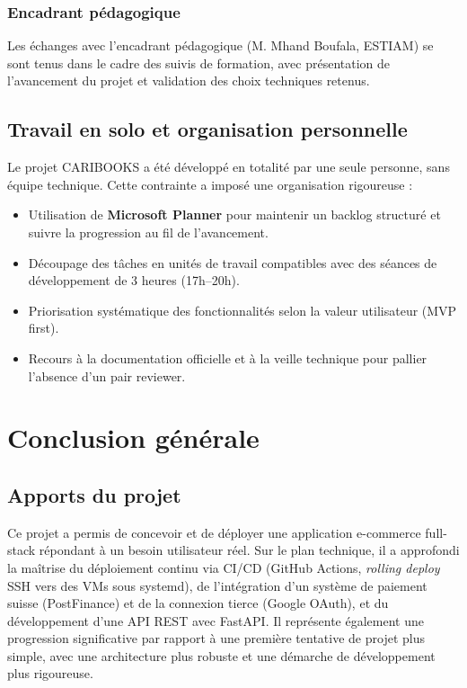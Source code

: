 \documentclass[12pt, a4paper]{report}
\renewcommand{\_}{\origunderscore\allowbreak}
\begin{document}
\subsection{Encadrant pédagogique}

Les échanges avec l'encadrant pédagogique (M. Mhand Boufala, ESTIAM) se sont tenus dans le cadre des suivis de formation, avec présentation de l'avancement du projet et validation des choix techniques retenus.

\section{Travail en solo et organisation personnelle}

Le projet CARIBOOKS a été développé en totalité par une seule personne, sans équipe technique. Cette contrainte a imposé une organisation rigoureuse :

\begin{itemize}
    \item Utilisation de \textbf{Microsoft Planner} pour maintenir un backlog structuré et suivre la progression au fil de l'avancement.
    \item Découpage des tâches en unités de travail compatibles avec des séances de développement de 3 heures (17h–20h).
    \item Priorisation systématique des fonctionnalités selon la valeur utilisateur (MVP first).
    \item Recours à la documentation officielle et à la veille technique pour pallier l'absence d'un pair reviewer.
\end{itemize}

\chapter*{Conclusion générale}

\section*{Apports du projet}

Ce projet a permis de concevoir et de déployer une application e-commerce full-stack répondant à un besoin utilisateur réel. Sur le plan technique, il a approfondi la maîtrise du déploiement continu via CI/CD (GitHub Actions, \textit{rolling deploy} SSH vers des VMs sous systemd), de l'intégration d'un système de paiement suisse (PostFinance) et de la connexion tierce (Google OAuth), et du développement d'une API REST avec FastAPI. Il représente également une progression significative par rapport à une première tentative de projet plus simple, avec une architecture plus robuste et une démarche de développement plus rigoureuse.
\end{document}
